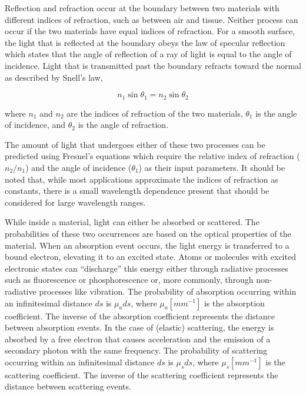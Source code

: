 Reflection and refraction occur at the boundary between two materials with different indices of refraction, such as between air and tissue. Neither process can occur if the two materials have equal indices of refraction. For a smooth surface, the light that is reflected at the boundary obeys the law of specular reflection which states that the angle of reflection of a ray of light is equal to the angle of incidence.\cite{Knight2013} Light that is transmitted past the boundary refracts toward the normal as described by Snell's law,

\begin{equation}
n_1 \sin \theta_1 = n_2 \sin \theta_2
\end{equation}

\noindent where $n_1$ and $n_2$ are the indices of refraction of the two materials, $\theta_1$ is the angle of incidence, and $\theta_2$ is the angle of refraction.

The amount of light that undergoes either of these two processes can be predicted using Fresnel's equations which require the relative index of refraction ($n_2 / n_1$) and the angle of incidence ($\theta_1$) as their input parameters.\cite{Pedrotti1993} It should be noted that, while most applications approximate the indices of refraction as constants, there is a small wavelength dependence present that should be considered for large wavelength ranges.\cite{Knight2013}

While inside a material, light can either be absorbed or scattered. The probabilities of these two occurrences are based on the optical properties of the material. When an absorption event occurs, the light energy is transferred to a bound electron, elevating it to an excited state.\cite{Jacques2004} Atoms or molecules with excited electronic states can ``discharge'' this energy either through radiative processes such as fluorescence or phosphorescence or, more commonly, through non-radiative processes like vibration. The probability of absorption occurring within an infinitesimal distance $ds$ is $\mu_ads$, where $\mu_a [mm^{-1}]$ is the absorption coefficient. The inverse of the absorption coefficient represents the distance between absorption events. In the case of (elastic) scattering, the energy is absorbed by a free electron that causes acceleration and the emission of a secondary photon with the same frequency.\cite{Jacques2004} The probability of scattering occurring within an infinitesimal distance $ds$ is $\mu_sds$, where $\mu_s [mm^{-1}]$ is the scattering coefficient. The inverse of the scattering coefficient represents the distance between scattering events.

